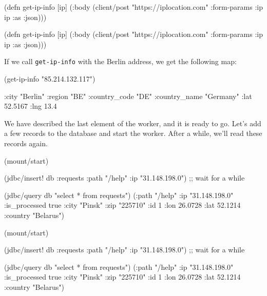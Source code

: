\ifnarrow

\begin{english}
  \begin{clojure}
(defn get-ip-info [ip]
  (:body (client/post
           "https://iplocation.com"
           {:form-params {:ip ip}
            :as :json})))
  \end{clojure}
\end{english}

\else

\begin{english}
  \begin{clojure}
(defn get-ip-info [ip]
  (:body (client/post "https://iplocation.com"
                      {:form-params {:ip ip}
                       :as :json})))
  \end{clojure}
\end{english}

\fi

\noindent
If we call \verb|get-ip-info| with the Berlin address, we get the following map:

\begin{english}
  \begin{clojure}
(get-ip-info "85.214.132.117")

{:city "Berlin"
 :region "BE"
 :country_code "DE"
 :country_name "Germany"
 :lat 52.5167
 :lng 13.4}
  \end{clojure}
\end{english}

We have described the last element of the worker, and it is ready to go. Let's add a few records to the database and start the worker. After a while, we'll read these records again.

\ifnarrow

\begin{english}
  \begin{clojure}
(mount/start)

(jdbc/insert! db :requests
  {:path "/help" :ip "31.148.198.0"})
;; wait for a while

(jdbc/query db "select * from requests")
({:path "/help"
  :ip "31.148.198.0"
  :is_processed true
  :city "Pinsk"
  :zip "225710" :id 1
  :lon 26.0728 :lat 52.1214
  :country "Belarus"})
  \end{clojure}
\end{english}

\else

\begin{english}
  \begin{clojure}
(mount/start)

(jdbc/insert! db :requests {:path "/help" :ip "31.148.198.0"})
;; wait for a while

(jdbc/query db "select * from requests")
({:path "/help" :ip "31.148.198.0" :is_processed true
  :city "Pinsk" :zip "225710" :id 1
  :lon 26.0728 :lat 52.1214 :country "Belarus"})
  \end{clojure}
\end{english}

